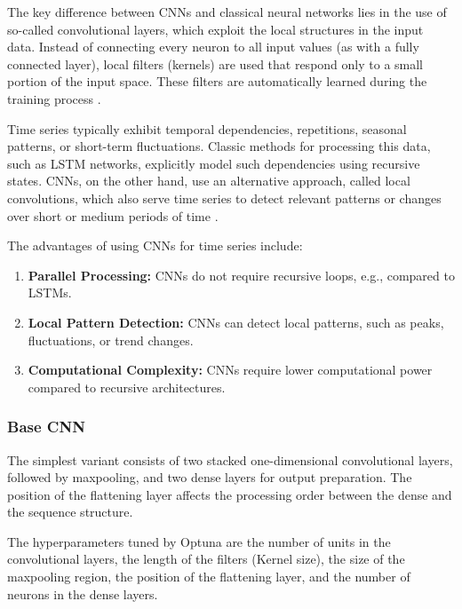 The key difference between CNNs and classical neural networks lies in the use of so-called convolutional layers, which exploit the local structures in the input data.
Instead of connecting every neuron to all input values (as with a fully connected layer), local filters (kernels) are used that respond only to a small portion of the input space.
These filters are automatically learned during the training process \cite{cnn-for-time-series}.

Time series typically exhibit temporal dependencies, repetitions, seasonal patterns, or short-term fluctuations.
Classic methods for processing this data, such as LSTM networks, explicitly model such dependencies using recursive states.
CNNs, on the other hand, use an alternative approach, called local convolutions, which also serve time series to detect relevant patterns or changes over short or medium periods of time \cite{cnn-local-convolution}.

The advantages of using CNNs for time series include:

\begin{enumerate}
    \item \textbf{Parallel Processing:} CNNs do not require recursive loops, e.g., compared to LSTMs.
    \item \textbf{Local Pattern Detection:} CNNs can detect local patterns, such as peaks, fluctuations, or trend changes.
    \item \textbf{Computational Complexity:} CNNs require lower computational power compared to recursive architectures.
\end{enumerate}

\subsubsection{Base CNN}

The simplest variant consists of two stacked one-dimensional convolutional layers, followed by maxpooling, and two dense layers for output preparation.
The position of the flattening layer affects the processing order between the dense and the sequence structure.

The hyperparameters tuned by Optuna are the number of units in the convolutional layers, the length of the filters (Kernel size), the size of the maxpooling region, the position of the flattening layer, and the number of neurons in the dense layers.



